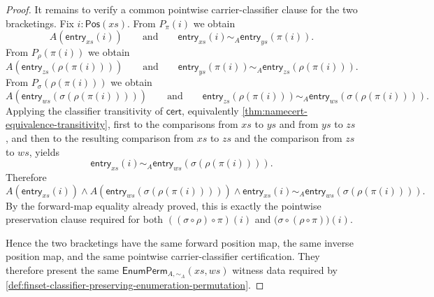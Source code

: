 \begin{proof}
It remains to verify a common pointwise carrier-classifier clause for the two bracketings. Fix $i:\mathsf{Pos}(xs)$. From $P_\pi(i)$ we obtain
$$
A(\mathsf{entry}_{xs}(i))
\qquad\text{and}\qquad
\mathsf{entry}_{xs}(i)\sim_A\mathsf{entry}_{ys}(\pi(i)).
$$
From $P_\rho(\pi(i))$ we obtain
$$
A(\mathsf{entry}_{zs}(\rho(\pi(i))))
\qquad\text{and}\qquad
\mathsf{entry}_{ys}(\pi(i))\sim_A\mathsf{entry}_{zs}(\rho(\pi(i))).
$$
From $P_\sigma(\rho(\pi(i)))$ we obtain
$$
A(\mathsf{entry}_{ws}(\sigma(\rho(\pi(i)))))
\qquad\text{and}\qquad
\mathsf{entry}_{zs}(\rho(\pi(i)))\sim_A\mathsf{entry}_{ws}(\sigma(\rho(\pi(i)))).
$$
Applying the classifier transitivity of $\mathsf{cert}$, equivalently \autoref{thm:namecert-equivalence-transitivity}, first to the comparisons from $xs$ to $ys$ and from $ys$ to $zs$, and then to the resulting comparison from $xs$ to $zs$ and the comparison from $zs$ to $ws$, yields
$$
\mathsf{entry}_{xs}(i)\sim_A\mathsf{entry}_{ws}(\sigma(\rho(\pi(i)))).
$$
Therefore
$$
A(\mathsf{entry}_{xs}(i))\land
A(\mathsf{entry}_{ws}(\sigma(\rho(\pi(i)))))\land
\mathsf{entry}_{xs}(i)\sim_A\mathsf{entry}_{ws}(\sigma(\rho(\pi(i)))).
$$
By the forward-map equality already proved, this is exactly the pointwise preservation clause required for both $((\sigma\circ\rho)\circ\pi)(i)$ and $\bigl(\sigma\circ(\rho\circ\pi)\bigr)(i)$.

Hence the two bracketings have the same forward position map, the same inverse position map, and the same pointwise carrier-classifier certification. They therefore present the same $\mathsf{EnumPerm}_{A,\sim_A}(xs,ws)$ witness data required by \autoref{def:finset-classifier-preserving-enumeration-permutation}.
\end{proof}
